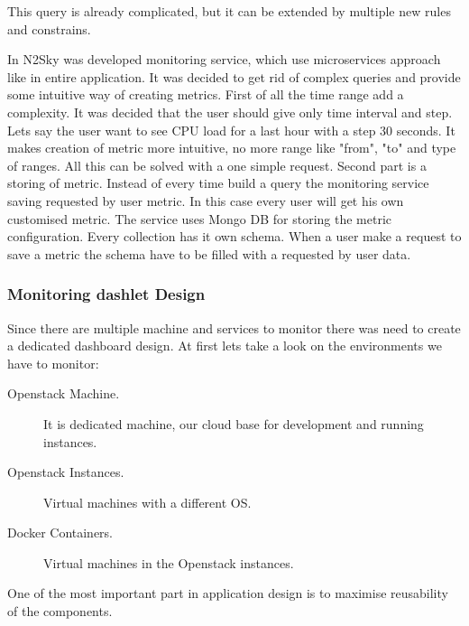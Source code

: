 This query is already complicated, but it can be extended by multiple new rules and constrains. 

In N2Sky was developed monitoring service, which use microservices approach like in entire application. It was decided to get rid of complex queries and provide some intuitive way of creating metrics. 
First of all the time range add a complexity. It was decided that the user should give only time interval and step. Lets say the user want to see CPU load for a last hour with a step 30 seconds. It makes creation of metric more intuitive, no more range like "from", "to" and type of ranges. All this can be solved with a one simple request. 
Second part is a storing of metric. Instead of every time build a query the monitoring service saving requested by user metric. In this case every user will get his own customised metric. 
The service uses Mongo DB for storing the metric configuration. Every collection has it own schema. When a user make a request to save a metric the schema have to be filled with a requested by user data.

\subsubsection{Monitoring dashlet Design}\label{Monitoring dashlet Design}

Since there are multiple machine and services to monitor there was need to create a dedicated dashboard design.  At first lets take a look on the environments we have to monitor: 
\begin{description}
\item[Openstack Machine.]  It is dedicated machine, our cloud base for development and running instances.
\item[Openstack Instances.]   Virtual machines with a different OS.
\item[Docker Containers.]  Virtual machines in the Openstack instances.
\end{description}

One of the most important part in application design is to maximise reusability of the components. 

